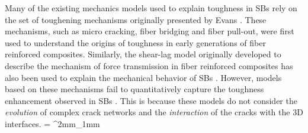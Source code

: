 \documentclass[10pt,letterpaper]{article}
\begin{document}
    Many of the existing mechanics models used to explain toughness in SBs rely on the set of toughening mechanisms originally presented by Evans \cite{evans1990perspective}. These mechanisms, such as micro cracking, fiber bridging and fiber pull-out, were first used to understand the origins of toughness in early generations of fiber reinforced composites. Similarly, the shear-lag model originally developed to describe the mechanism of force transmission in fiber reinforced composites \cite{cox1952elasticity} has also been used to explain the mechanical behavior of SBs \cite{Jackson1988,gao2003materials}. However, models based on these mechanisms fail to quantitatively capture the toughness enhancement observed in SBs \cite{barthelat2011toughness,bloyer1998fracture,wang2011deformation,nalla2005mechanistic}. This is because these models do not consider the \emph{evolution} of complex crack networks and the \emph{interaction} of the cracks with the 3D interfaces.
%
      \tabulinesep = ^2mm_1mm
      \everyrow{\tabucline[.4mm  white]{}}
%
\end{document}
